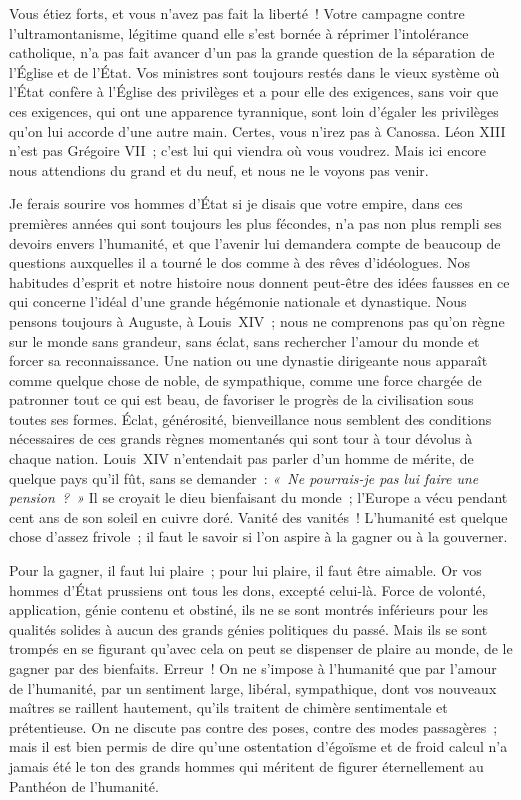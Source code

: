 \documentclass[french,twoside]{book} %
\newcommand\orgName[1]{#1}
\newcommand\persName[1]{#1}
\newcommand\placeName[1]{#1}
\begin{document}
Vous étiez forts, et vous n’avez pas fait la liberté ! Votre campagne contre l’ultramontanisme, légitime quand elle s’est bornée à réprimer l’intolérance catholique, n’a pas fait avancer d’un pas la grande question de la séparation de l’{\orgName Église} et de l’{\orgName État}. Vos ministres sont toujours restés dans le vieux système où l’{\orgName État} confère à l’{\orgName Église} des privilèges et a pour elle des exigences, sans voir que ces exigences, qui ont une apparence tyrannique, sont loin d’égaler les privilèges qu’on lui accorde d’une autre main. Certes, vous n’irez pas à {\placeName Canossa}. {\persName Léon XIII} n’est pas {\persName Grégoire VII} ; c’est lui qui viendra où vous voudrez. Mais ici encore nous attendions du grand et du neuf, et nous ne le voyons pas venir.\par
Je ferais sourire vos hommes d’État si je disais que votre empire, dans ces premières années qui sont toujours les plus fécondes, n’a pas non plus rempli ses devoirs envers l’humanité, et que l’avenir lui demandera compte de beaucoup de questions auxquelles il a tourné le dos comme à des rêves d’idéologues. Nos habitudes d’esprit et notre histoire nous donnent peut-être des idées fausses en ce qui concerne l’idéal d’une grande hégémonie nationale et dynastique. Nous pensons toujours à {\persName Auguste}, à {\persName Louis XIV} ; nous ne comprenons pas qu’on règne sur le monde sans grandeur, sans éclat, sans rechercher l’amour du monde et forcer sa reconnaissance. Une nation ou une dynastie dirigeante nous apparaît comme quelque chose de noble, de sympathique, comme une force chargée de patronner tout ce qui est beau, de favoriser le progrès de la civilisation sous toutes ses formes. Éclat, générosité, bienveillance nous semblent des conditions nécessaires de ces grands règnes momentanés qui sont tour à tour dévolus à chaque nation. {\persName Louis XIV} n’entendait pas parler d’un homme de mérite, de quelque pays qu’il fût, sans se demander : \emph{« Ne pourrais-je pas lui faire une pension ? »} Il se croyait le dieu bienfaisant du monde ; l’{\orgName Europe} a vécu pendant cent ans de son soleil en cuivre doré. Vanité des vanités ! L’humanité est quelque chose d’assez frivole ; il faut le savoir si l’on aspire à la gagner ou à la gouverner.\par
Pour la gagner, il faut lui plaire ; pour lui plaire, il faut être aimable. Or vos hommes d’État prussiens ont tous les dons, excepté celui-là. Force de volonté, application, génie contenu et obstiné, ils ne se sont montrés inférieurs pour les qualités solides à aucun des grands génies politiques du passé. Mais ils se sont trompés en se figurant qu’avec cela on peut se dispenser de plaire au monde, de le gagner par des bienfaits. Erreur ! On ne s’impose à l’humanité que par l’amour de l’humanité, par un sentiment large, libéral, sympathique, dont vos nouveaux maîtres se raillent hautement, qu’ils traitent de chimère sentimentale et prétentieuse. On ne discute pas contre des poses, contre des modes passagères ; mais il est bien permis de dire qu’une ostentation d’égoïsme et de froid calcul n’a jamais été le ton des grands hommes qui méritent de figurer éternellement au {\orgName Panthéon} de l’humanité.\par
\end{document}
